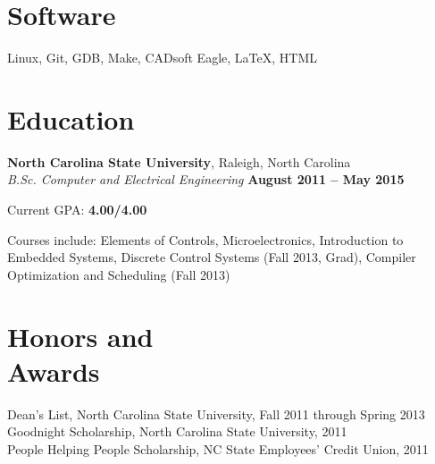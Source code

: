 \documentclass[margin,line,letterpaper]{resume}
\begin{document}
\begin{resume}
    \section{\mysidestyle Software}
    Linux, Git, GDB, Make, CADsoft Eagle, \LaTeX, HTML

    \section{\mysidestyle Education}

    \textbf{North Carolina State University}, Raleigh, North Carolina \vspace{2mm}\\\vspace{1mm}%
    \textsl{B.Sc. Computer and Electrical Engineering} \hfill \textbf{August 2011 -- May 2015}\vspace{-3mm}\\\vspace{-1mm}%
    \begin{list2}
        \item Current GPA: \textbf{4.00/4.00}
        \item Courses include: Elements of Controls, Microelectronics, Introduction to Embedded Systems,
            Discrete Control Systems (Fall 2013, Grad), Compiler Optimization and Scheduling (Fall 2013)
    \end{list2}\vspace{-1.5mm}


    \section{\mysidestyle Honors and\\Awards}

    Dean's List, North Carolina State University, Fall 2011 through Spring 2013   \vspace{-8mm}\\%

    Goodnight Scholarship, North Carolina State University, 2011              \vspace{-8mm}\\%

    People Helping People Scholarship, NC State Employees' Credit Union, 2011 \vspace{-8mm}\\%


\end{resume}
\end{document}

